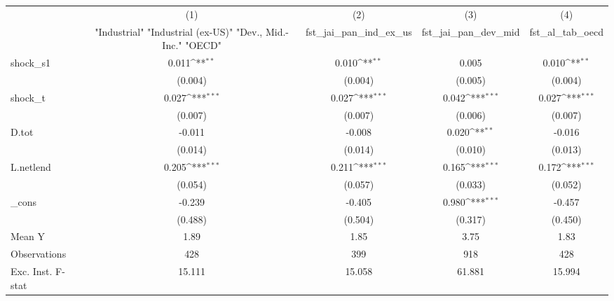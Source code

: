 {
\def\sym#1{\ifmmode^{#1}\else\(^{#1}\)\fi}
\begin{tabular}{l*{4}{c}}
\toprule
            &\multicolumn{1}{c}{(1)}&\multicolumn{1}{c}{(2)}&\multicolumn{1}{c}{(3)}&\multicolumn{1}{c}{(4)}\\
            &\multicolumn{1}{c}{ "Industrial" "Industrial (ex-US)" "Dev., Mid.-Inc." "OECD" }&\multicolumn{1}{c}{fst\_jai\_pan\_ind\_ex\_us}&\multicolumn{1}{c}{fst\_jai\_pan\_dev\_mid}&\multicolumn{1}{c}{fst\_al\_tab\_oecd}\\
\midrule
shock\_s1    &       0.011\sym{**} &       0.010\sym{**} &       0.005         &       0.010\sym{**} \\
            &     (0.004)         &     (0.004)         &     (0.005)         &     (0.004)         \\
\addlinespace
shock\_t     &       0.027\sym{***}&       0.027\sym{***}&       0.042\sym{***}&       0.027\sym{***}\\
            &     (0.007)         &     (0.007)         &     (0.006)         &     (0.007)         \\
\addlinespace
D.tot       &      -0.011         &      -0.008         &       0.020\sym{**} &      -0.016         \\
            &     (0.014)         &     (0.014)         &     (0.010)         &     (0.013)         \\
\addlinespace
L.netlend   &       0.205\sym{***}&       0.211\sym{***}&       0.165\sym{***}&       0.172\sym{***}\\
            &     (0.054)         &     (0.057)         &     (0.033)         &     (0.052)         \\
\addlinespace
\_cons      &      -0.239         &      -0.405         &       0.980\sym{***}&      -0.457         \\
            &     (0.488)         &     (0.504)         &     (0.317)         &     (0.450)         \\
\midrule
Mean Y      &        1.89         &        1.85         &        3.75         &        1.83         \\
Observations&         428         &         399         &         918         &         428         \\
Exc. Inst. F-stat&      15.111         &      15.058         &      61.881         &      15.994         \\
\bottomrule
\end{tabular}
}
